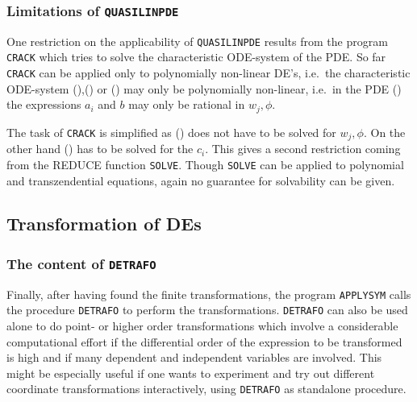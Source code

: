 \subsubsection{Limitations of \texttt{QUASILINPDE}}
One restriction on the applicability of \texttt{QUASILINPDE} results from
the program \texttt{CRACK} which tries to solve the
characteristic ODE-system of the PDE. So far \texttt{CRACK} can be
applied only to polynomially non-linear DE's, i.e.\ the characteristic
ODE-system (),() or () may
only be polynomially non-linear, i.e.\ in the PDE ()
the expressions $a_i$ and $b$ may only be rational in $w_j,\phi$.

The task of \texttt{CRACK} is simplified as () does not have to
be solved for $w_j, \phi$. On the other hand () has to be
solved for the $c_i$. This gives a
second restriction coming from the REDUCE function \texttt{SOLVE}.
Though \texttt{SOLVE} can be applied
to polynomial and transzendential equations, again no guarantee for
solvability can be given.
\subsection{Transformation of DEs}
\subsubsection{The content of \texttt{DETRAFO}}
Finally, after having found the finite transformations,
the program \texttt{APPLYSYM} calls the procedure
\texttt{DETRAFO} to perform the transformations. \texttt{DETRAFO}
can also be used alone to do point- or higher order transformations
which involve a considerable computational effort if the
differential order of the expression to be transformed is high and
if many dependent and independent variables are involved.
This might be especially useful if one wants to experiment
and try out different coordinate transformations interactively,
using \texttt{DETRAFO} as standalone procedure.

